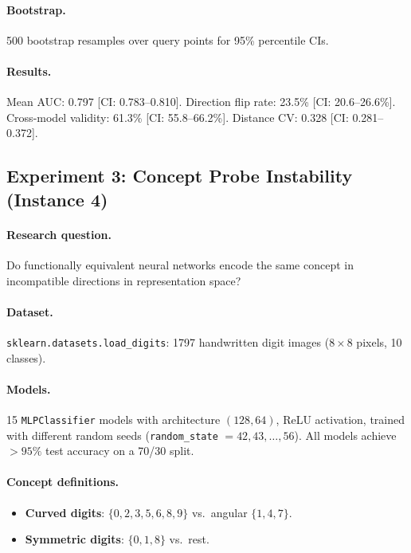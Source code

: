 \documentclass[11pt,a4paper]{article}
\begin{document}
\paragraph{Bootstrap.}
500 bootstrap resamples over query points for 95\% percentile CIs.

\paragraph{Results.}
Mean AUC: 0.797 [CI: 0.783--0.810].  Direction flip rate: 23.5\%
[CI: 20.6--26.6\%].  Cross-model validity: 61.3\% [CI: 55.8--66.2\%].
Distance CV: 0.328 [CI: 0.281--0.372].

\subsection{Experiment 3: Concept Probe Instability (Instance 4)}
\label{app:exp-concept}

\paragraph{Research question.}
Do functionally equivalent neural networks encode the same concept in
incompatible directions in representation space?

\paragraph{Dataset.}
\texttt{sklearn.datasets.load\_digits}: 1797 handwritten digit images
($8 \times 8$ pixels, 10 classes).

\paragraph{Models.}
15 \texttt{MLPClassifier} models with architecture $(128, 64)$, ReLU
activation, trained with different random seeds (\texttt{random\_state}
$= 42, 43, \ldots, 56$).  All models achieve $>95\%$ test accuracy on
a 70/30 split.

\paragraph{Concept definitions.}
\begin{itemize}[nosep]
  \item \textbf{Curved digits}: $\{0, 2, 3, 5, 6, 8, 9\}$ vs.\ angular
    $\{1, 4, 7\}$.
  \item \textbf{Symmetric digits}: $\{0, 1, 8\}$ vs.\ rest.
\end{itemize}
\end{document}
